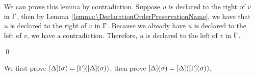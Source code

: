 We can prove this lemma by contradiction. Suppose $u$ is declared to the right
of $v$ in $\Gamma$, then by Lemma~\ref{lemma:\DeclarationOrderPreservationName},
we have that $u$ is declared to the right of $v$ in $\Gamma$. Because we already
have $u$ is declared to the left of $v$, we have a contradiction. Therefore, $u$
is declared to the left of $v$ in $\Gamma$.

\qed

\begin{lemma}[\SubstitutionExtensionInvarianceName]
  \label{lemma:\SubstitutionExtensionInvarianceName}
  \SubstitutionExtensionInvarianceBody
\end{lemma}

\proof

We first prove $[\Delta](\sigma) = [\Gamma]([\Delta](\sigma))$,
then prove $[\Delta](\sigma) = [\Delta]([\Gamma](\sigma))$.


